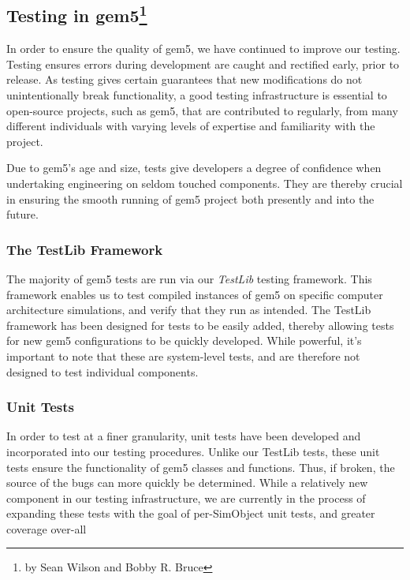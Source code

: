 \subsection[Testing in gem5]{Testing in gem5\footnote{by Sean Wilson and Bobby R. Bruce}}
\label{sec:testing}

In order to ensure the quality of gem5, we have continued to improve our
testing. Testing ensures errors during development are caught and rectified
early, prior to release. As testing gives certain guarantees that new
modifications do not unintentionally break functionality, a good testing
infrastructure is essential to open-source projects, such as gem5, that are
contributed to regularly, from many different individuals with varying levels
of expertise and familiarity with the project.

Due to gem5's age and size, tests give developers a degree of confidence when
undertaking engineering on seldom touched components. They are thereby crucial
in ensuring the smooth running of gem5 project both presently and into the
future.

\subsubsection{The TestLib Framework}

The majority of gem5 tests are run via our \emph{TestLib} testing framework.
This framework enables us to test compiled instances of gem5 on specific
computer architecture simulations, and verify that they run as intended. The
TestLib framework has been designed for tests to be easily added, thereby
allowing tests for new gem5 configurations to be quickly developed. While
powerful, it's important to note that these are system-level tests, and are
therefore not designed to test individual components.

\subsubsection{Unit Tests}

In order to test at a finer granularity, unit tests have been developed and
incorporated into our testing procedures. Unlike our TestLib tests, these unit
tests ensure the functionality of gem5 classes and functions. Thus, if broken,
the source of the bugs can more quickly be determined. While a relatively new
component in our testing infrastructure, we are currently in the process of
expanding these tests with the goal of per-SimObject unit tests, and greater
coverage over-all

